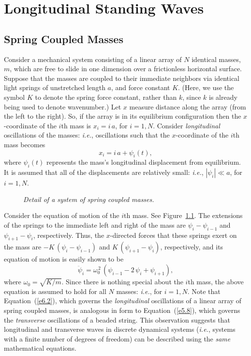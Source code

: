 \chapter{Longitudinal Standing Waves}\label{c6}
\section{Spring Coupled Masses}
Consider a mechanical system consisting of a linear array of $N$ identical masses, $m$,
which are free to slide in one dimension over a frictionless
horizontal surface. Suppose that the masses are coupled to their immediate neighbors via
identical light springs of unstretched length $a$, and force constant $K$. (Here, we use the symbol $K$ to
denote the spring force constant, rather than $k$, since $k$ is already being used to denote wavenumber.) Let $x$
measure distance along the array (from the left to the right). So, if  the array is in its equilibrium configuration then the $x$-coordinate
of the $i$th mass is $x_i=i\,a$, for $i=1,N$. Consider {\em longitudinal}\/ oscillations
of the masses: {\em i.e.}, oscillations such that the $x$-coordinate of the $i$th mass becomes
\begin{equation}
x_i = i\,a + \psi_i(t),
\end{equation}
where $\psi_i(t)$ represents the mass's  longitudinal displacement from equilibrium. It is assumed that all of the displacements are relatively small: {\em i.e.},  $|\psi_i|\ll a$, for
$i=1,N$. 

\begin{figure}
\epsfysize=1.7in
\centerline{}
\caption{\em Detail of a system of spring coupled masses.}\label{f6.1}   
\end{figure}

Consider the equation of motion of the $i$th mass. See Figure~\ref{f6.1}. The
extensions of the springs to the immediate left and  right of the mass are
$\psi_i-\psi_{i-1}$ and $\psi_{i+1}-\psi_i$, respectively. Thus, the $x$-directed
forces that these springs exert on the  mass are $-K\,(\psi_i-\psi_{i-1})$ and
$K\,(\psi_{i+1}-\psi_i)$, respectively, and its equation of
motion is easily shown to be
\begin{equation}\label{e6.2}
\ddot{\psi}_i = \omega_0^{\,2}\,(\psi_{i-1} -2\,\psi_i+ \psi_{i+1}),
\end{equation}
where $\omega_0=\sqrt{K/m}$. Since there is nothing special about the $i$th mass, the
above equation is assumed to hold  for all $N$ masses: {\em i.e.}, for $i=1,N$.
Note that Equation~(\ref{e6.2}), which governs the {\em longitudinal}\/ oscillations of a linear array of spring coupled masses, is analogous in
form to Equation~(\ref{e5.8}), which governs the {\em transverse}\/ oscillations
of a beaded string. This observation suggests that longitudinal and transverse waves in discrete dynamical systems ({\em i.e.},  systems with  a finite number of degrees
of freedom)
can be described using the {\em same}\/ mathematical equations.


